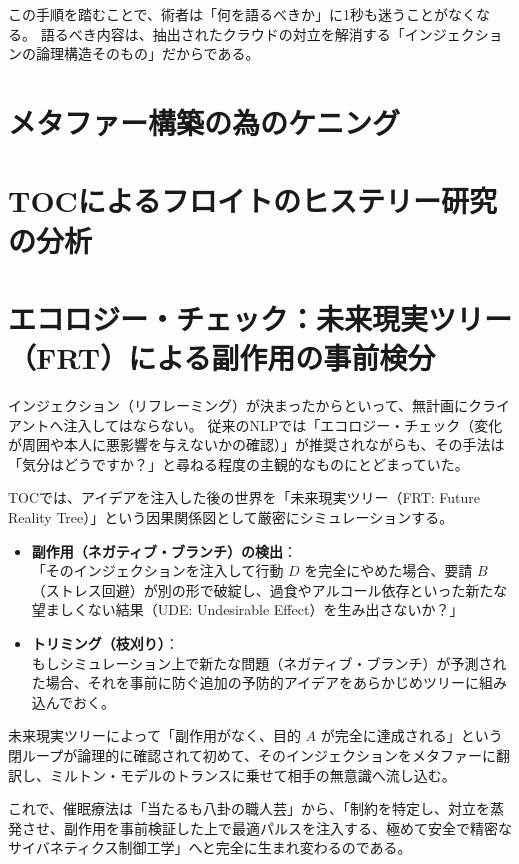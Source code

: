 この手順を踏むことで、術者は「何を語るべきか」に1秒も迷うことがなくなる。
語るべき内容は、抽出されたクラウドの対立を解消する「インジェクションの論理構造そのもの」だからである。

\section{メタファー構築の為のケニング}

\section{TOCによるフロイトのヒステリー研究の分析}

\section{エコロジー・チェック：未来現実ツリー（FRT）による副作用の事前検分}

インジェクション（リフレーミング）が決まったからといって、無計画にクライアントへ注入してはならない。
従来のNLPでは「エコロジー・チェック（変化が周囲や本人に悪影響を与えないかの確認）」が推奨されながらも、その手法は「気分はどうですか？」と尋ねる程度の主観的なものにとどまっていた。

TOCでは、アイデアを注入した後の世界を「未来現実ツリー（FRT: Future Reality Tree）」という因果関係図として厳密にシミュレーションする。

\begin{itemize}
  \item \textbf{副作用（ネガティブ・ブランチ）の検出}：\\
  「そのインジェクションを注入して行動 $D$ を完全にやめた場合、要請 $B$（ストレス回避）が別の形で破綻し、過食やアルコール依存といった新たな望ましくない結果（UDE: Undesirable Effect）を生み出さないか？」
  \item \textbf{トリミング（枝刈り）}：\\
  もしシミュレーション上で新たな問題（ネガティブ・ブランチ）が予測された場合、それを事前に防ぐ追加の予防的アイデアをあらかじめツリーに組み込んでおく。
\end{itemize}

未来現実ツリーによって「副作用がなく、目的 $A$ が完全に達成される」という閉ループが論理的に確認されて初めて、そのインジェクションをメタファーに翻訳し、ミルトン・モデルのトランスに乗せて相手の無意識へ流し込む。

これで、催眠療法は「当たるも八卦の職人芸」から、「制約を特定し、対立を蒸発させ、副作用を事前検証した上で最適パルスを注入する、極めて安全で精密なサイバネティクス制御工学」へと完全に生まれ変わるのである。


